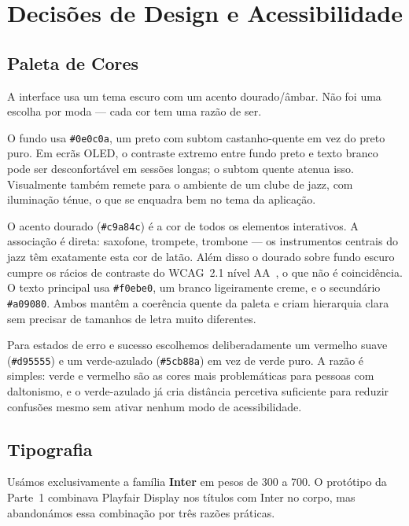 \chapter{Decisões de Design e Acessibilidade}
\label{chap:design}

\section{Paleta de Cores}
\label{chap4:sec:cores}

A interface usa um tema escuro com um acento dourado/âmbar. Não foi uma escolha por moda --- cada cor tem uma razão de ser.

O fundo usa \texttt{\#0e0c0a}, um preto com subtom castanho-quente em vez do preto puro. Em ecrãs OLED, o contraste extremo entre fundo preto e texto branco pode ser desconfortável em sessões longas; o subtom quente atenua isso. Visualmente também remete para o ambiente de um clube de jazz, com iluminação ténue, o que se enquadra bem no tema da aplicação.

O acento dourado (\texttt{\#c9a84c}) é a cor de todos os elementos interativos. A associação é direta: saxofone, trompete, trombone --- os instrumentos centrais do jazz têm exatamente esta cor de latão. Além disso o dourado sobre fundo escuro cumpre os rácios de contraste do \ac{WCAG}~2.1 nível AA~\cite{wcag21}, o que não é coincidência. O texto principal usa \texttt{\#f0ebe0}, um branco ligeiramente creme, e o secundário \texttt{\#a09080}. Ambos mantêm a coerência quente da paleta e criam hierarquia clara sem precisar de tamanhos de letra muito diferentes.

Para estados de erro e sucesso escolhemos deliberadamente um vermelho suave (\texttt{\#d95555}) e um verde-azulado (\texttt{\#5cb88a}) em vez de verde puro. A razão é simples: verde e vermelho são as cores mais problemáticas para pessoas com daltonismo, e o verde-azulado já cria distância percetiva suficiente para reduzir confusões mesmo sem ativar nenhum modo de acessibilidade.

\section{Tipografia}
\label{chap4:sec:tipografia}

Usámos exclusivamente a família \textbf{Inter} em pesos de 300 a 700. O protótipo da Parte~1 combinava Playfair Display nos títulos com Inter no corpo, mas abandonámos essa combinação por três razões práticas.

